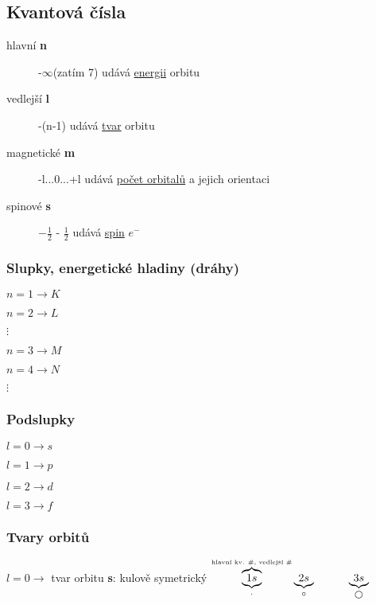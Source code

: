 \documentclass{article}
\begin{document}
\subsection{Kvantová čísla}
    \begin{description}
        \item[hlavní \textbf{n}] -$\infty$(zatím 7) \tab udává \underline{energii} orbitu
        \item[vedlejší \textbf{l}] -(n-1) \tab udává \underline{tvar} orbitu
        \item[magnetické \textbf{m}] \tab -l...0...+l \tab udává \underline{počet orbitalů} a jejich orientaci
        \item[spinové \textbf{s}] \tab $-\frac{1}{2}$ - $\frac{1}{2}$ \tab udává \underline{spin} $e^-$
    \end{description}

\centering
\subsubsection{Slupky, energetické hladiny (dráhy)}
    \begin{multicols}{2}
        $n = 1 \to K$

        $n = 2 \to L$
        
        $\vdots$
        
        $n = 3 \to M$
        
        $n = 4 \to N$

        $\vdots$ 
    \end{multicols}

\centering
\subsubsection{Podslupky}
    \begin{multicols}{2}
        $l = 0 \to s$

        $l = 1 \to p$
        
        $l = 2 \to d$
        
        $l = 3 \to f$
    \end{multicols}


\subsubsection{Tvary orbitů}
    \vspace{2em}
    \raggedright
    \TabPositions{0em, 20em}
    $l = 0 \to$ tvar orbitu \textbf{s}: kulově symetrický
    \tab
    $\overbrace{\underbrace{1s}_{\cdot}}^{\text{\tiny{hlavní kv. \#, vedlejší \#}}}  \underbrace{2s}_{\circ} \hspace{3em} \underbrace{3s}_{\bigcirc}$
    
\end{document}
